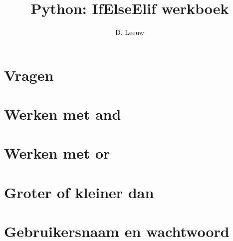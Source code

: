 \documentclass[a4paper,12pt,twoside,openright,titlepage]{article}
\author{D. Leeuw}
\title{Python: IfElseElif werkboek}
\date{\today\\
0.0.0\\
\vfill
\raggedright
\copyright\ 2025 Dennis Leeuw\\
}
\begin{document}

\maketitle



\section{Vragen}


\section{Werken met and}


\section{Werken met or}


\section{Groter of kleiner dan}


\section{Gebruikersnaam en wachtwoord}



\printindex
\end{document}
